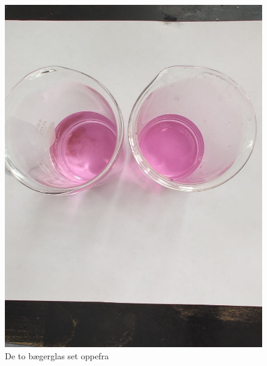 \documentclass{report}
\begin{document}
\begin{figure}[H]
\begin{center}
  \includegraphics[scale=0.23]{for7ab.jpeg}
\end{center}
\caption{De to bægerglas set oppefra}
\label{fig:7ab}
\end{figure}
\end{document}
